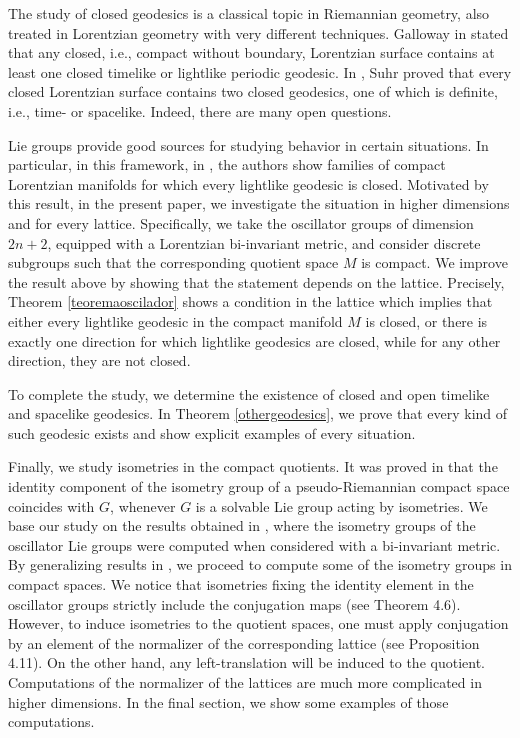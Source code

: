 \documentclass[12pt]{amsart}
\theoremstyle{plain}
\theoremstyle{definition}
\theoremstyle{remark}
\begin{document}
The study of closed geodesics is a classical topic in Riemannian geometry, also treated in Lorentzian geometry with very different techniques. Galloway in \cite{Ga} stated that any closed, i.e., compact without boundary, Lorentzian surface contains at least one closed timelike or lightlike periodic geodesic. In \cite{Su}, Suhr proved that every closed Lorentzian surface contains two closed geodesics, one of which is definite, i.e., time- or spacelike. Indeed, there are many open questions.

Lie groups provide good sources for studying behavior in certain situations. In particular, in this framework, in \cite{BOV}, the authors show families of compact Lorentzian manifolds for which every lightlike geodesic is closed. Motivated by this result, in the present paper, we investigate the situation in higher dimensions and for every lattice. Specifically, we take the oscillator groups of dimension $2n+2$, equipped with a Lorentzian bi-invariant metric, and consider discrete subgroups such that the corresponding quotient space $M$ is compact. We improve the result above by showing that the statement depends on the lattice. Precisely, Theorem \ref{teoremaoscilador} shows a condition in the lattice which implies that either every lightlike geodesic in the compact manifold $M$ is closed, or there is exactly one direction for which lightlike geodesics are closed, while for any other direction, they are not closed.

To complete the study, we determine the existence of closed and open timelike and spacelike geodesics. In Theorem \ref{othergeodesics}, we prove that every kind of such geodesic exists and show explicit examples of every situation.

Finally, we study isometries in the compact quotients. It was proved in \cite{BG} that the identity component of the isometry group of a pseudo-Riemannian compact space coincides with $G$, whenever $G$ is a solvable Lie group acting by isometries. We base our study on the results obtained in \cite{Bou}, where the isometry groups of the oscillator Lie groups were computed when considered with a bi-invariant metric. By generalizing results in \cite{BOV}, we proceed to compute some of the isometry groups in compact spaces. We notice that isometries fixing the identity element in the oscillator groups strictly include the conjugation maps (see Theorem 4.6). However, to induce isometries to the quotient spaces, one must apply conjugation by an element of the normalizer of the corresponding lattice (see Proposition 4.11). On the other hand, any left-translation will be induced to the quotient. Computations of the normalizer of the lattices are much more complicated in higher dimensions. In the final section, we show some examples of those computations.
\end{document}
